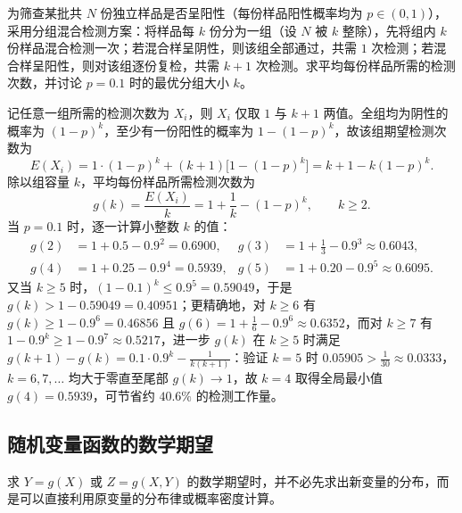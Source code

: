 \begin{example}[title={合并检测的分组优化}]
\label{eg:pooled-testing}
为筛查某批共 $N$ 份独立样品是否呈阳性（每份样品阳性概率均为 $p\in(0,1)$），采用分组混合检测方案：将样品每 $k$ 份分为一组（设 $N$ 被 $k$ 整除），先将组内 $k$ 份样品混合检测一次；若混合样呈阴性，则该组全部通过，共需 $1$ 次检测；若混合样呈阳性，则对该组逐份复检，共需 $k+1$ 次检测。求平均每份样品所需的检测次数，并讨论 $p=0.1$ 时的最优分组大小 $k$。
\begin{solution}
记任意一组所需的检测次数为 $X_i$，则 $X_i$ 仅取 $1$ 与 $k+1$ 两值。全组均为阴性的概率为 $(1-p)^k$，至少有一份阳性的概率为 $1-(1-p)^k$，故该组期望检测次数为
\[
  E(X_i)=1\cdot(1-p)^k+(k+1)\bigl[1-(1-p)^k\bigr]=k+1-k(1-p)^k.
\]
除以组容量 $k$，平均每份样品所需检测次数为
\[
  g(k)=\frac{E(X_i)}{k}=1+\frac{1}{k}-(1-p)^k,\qquad k\ge 2.
\]
当 $p=0.1$ 时，逐一计算小整数 $k$ 的值：
\[
\begin{aligned}
  g(2)&=1+0.5-0.9^2=0.6900,& g(3)&=1+\frac{1}{3}-0.9^3\approx 0.6043,\\
  g(4)&=1+0.25-0.9^4=0.5939,& g(5)&=1+0.20-0.9^5\approx 0.6095.
\end{aligned}
\]
又当 $k\ge 5$ 时，$(1-0.1)^k\le 0.9^5=0.59049$，于是 $g(k)>1-0.59049=0.40951$；更精确地，对 $k\ge 6$ 有 $g(k)\ge 1-0.9^6=0.46856$ 且 $g(6)=1+\frac{1}{6}-0.9^6\approx 0.6352$，而对 $k\ge 7$ 有 $1-0.9^k\ge 1-0.9^7\approx 0.5217$，进一步 $g(k)$ 在 $k\ge 5$ 时满足 $g(k+1)-g(k)=0.1\cdot 0.9^k-\frac{1}{k(k+1)}$：验证 $k=5$ 时 $0.05905>\frac{1}{30}\approx 0.0333$，$k=6,7,\ldots$ 均大于零直至尾部 $g(k)\to 1$，故 $k=4$ 取得全局最小值 $g(4)=0.5939$，可节省约 $40.6\%$ 的检测工作量。
\end{solution}
\end{example}

\subsection{随机变量函数的数学期望}

求 $Y=g(X)$ 或 $Z=g(X,Y)$ 的数学期望时，并不必先求出新变量的分布，而是可以直接利用原变量的分布律或概率密度计算。

